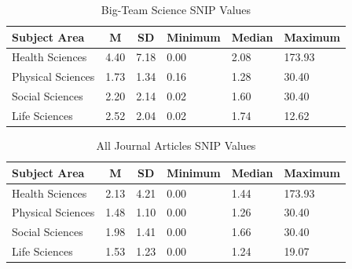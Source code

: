 \documentclass[
  man]{apa7}
\begin{document}
\begin{table}[tbp]

\begin{center}
\begin{threeparttable}

\caption{\label{tab:tab-snip}Big-Team Science SNIP Values}

\begin{tabular}{llllll}
\toprule
Subject Area & \multicolumn{1}{c}{M} & \multicolumn{1}{c}{SD} & \multicolumn{1}{c}{Minimum} & \multicolumn{1}{c}{Median} & \multicolumn{1}{c}{Maximum}\\
\midrule
Health Sciences & 4.40 & 7.18 & 0.00 & 2.08 & 173.93\\
Physical Sciences & 1.73 & 1.34 & 0.16 & 1.28 & 30.40\\
Social Sciences & 2.20 & 2.14 & 0.02 & 1.60 & 30.40\\
Life Sciences & 2.52 & 2.04 & 0.02 & 1.74 & 12.62\\
\bottomrule
\end{tabular}

\end{threeparttable}
\end{center}

\end{table}

\begin{table}[tbp]

\begin{center}
\begin{threeparttable}

\caption{\label{tab:unnamed-chunk-3}All Journal Articles SNIP Values}

\begin{tabular}{llllll}
\toprule
Subject Area & \multicolumn{1}{c}{M} & \multicolumn{1}{c}{SD} & \multicolumn{1}{c}{Minimum} & \multicolumn{1}{c}{Median} & \multicolumn{1}{c}{Maximum}\\
\midrule
Health Sciences & 2.13 & 4.21 & 0.00 & 1.44 & 173.93\\
Physical Sciences & 1.48 & 1.10 & 0.00 & 1.26 & 30.40\\
Social Sciences & 1.98 & 1.41 & 0.00 & 1.66 & 30.40\\
Life Sciences & 1.53 & 1.23 & 0.00 & 1.24 & 19.07\\
\bottomrule
\end{tabular}

\end{threeparttable}
\end{center}

\end{table}
\end{document}
